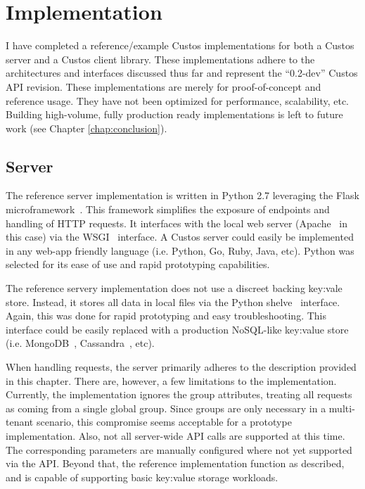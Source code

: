 \section{Implementation}

I have completed a reference/example Custos implementations for both a
Custos server and a Custos client library. These implementations
adhere to the architectures and interfaces discussed thus far and
represent the ``0.2-dev'' Custos API revision. These implementations
are merely for proof-of-concept and reference usage. They have not
been optimized for performance, scalability, etc. Building
high-volume, fully production ready implementations is left to future
work (see Chapter \ref{chap:conclusion}).

\subsection{Server}

The reference server implementation is written in Python 2.7
leveraging the Flask microframework~\cite{python-flask}. This
framework simplifies the exposure of endpoints and handling of HTTP
requests. It interfaces with the local web server
(Apache~\cite{apache} in this case) via the WSGI~\cite{pep-wsgi}
interface. A Custos server could easily be implemented in any web-app
friendly language (i.e. Python, Go, Ruby, Java, etc). Python was
selected for its ease of use and rapid prototyping capabilities.

The reference servery implementation does not use a discreet backing
key:vale store. Instead, it stores all data in local files via the
Python shelve~\cite{python-shelve} interface. Again, this was done for
rapid prototyping and easy troubleshooting. This interface could be
easily replaced with a production NoSQL-like key:value store
(i.e. MongoDB~\cite{mongodb}, Cassandra~\cite{cassandra}, etc).

When handling requests, the server primarily adheres to the
description provided in this chapter. There are, however, a few
limitations to the implementation. Currently, the implementation
ignores the group attributes, treating all requests as coming from a
single global group. Since groups are only necessary in a multi-tenant
scenario, this compromise seems acceptable for a prototype
implementation. Also, not all server-wide API calls are supported at
this time. The corresponding parameters are manually configured where
not yet supported via the API. Beyond that, the reference
implementation function as described, and is capable of supporting
basic key:value storage workloads.

